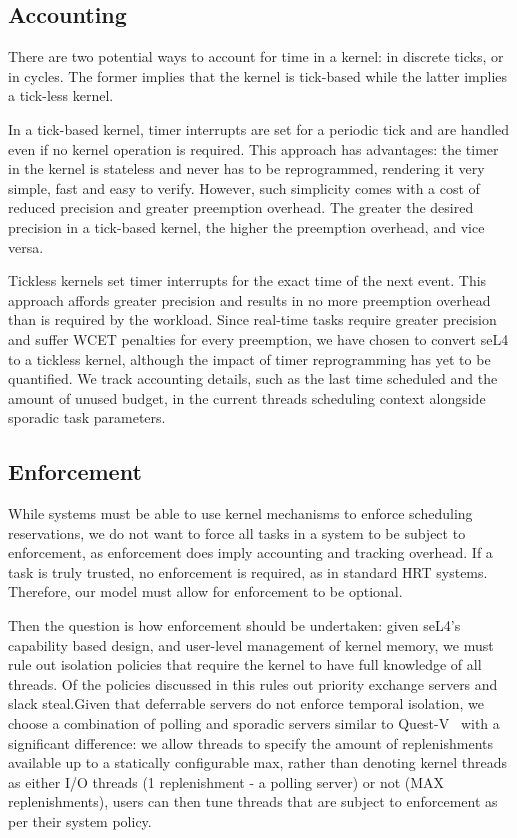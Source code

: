 
\subsection{Accounting}
\label{sec:tick-v-tickless}

There are two potential ways to account for time in a kernel: in discrete ticks, or in cycles.
The former implies that the kernel is tick-based while the latter implies a tick-less kernel.

In a tick-based kernel, timer interrupts are set for a periodic tick and are handled even if no kernel operation is required.
This approach has advantages: the timer in the kernel is stateless and never has to be reprogrammed, rendering it very simple, fast and easy to verify.
However, such simplicity comes with a cost of reduced precision and greater preemption overhead.
The greater the desired precision in a tick-based kernel, the higher the preemption overhead, and vice versa.

Tickless kernels set timer interrupts for the exact time of the next event.
This approach affords greater precision and results in no more preemption overhead than is required by the workload.
Since real-time tasks require greater precision and suffer \gls{WCET} penalties for every preemption, we have chosen to convert seL4 to a tickless kernel, although the impact of timer reprogramming has yet to be quantified.
We track accounting details, such as the last time scheduled and the amount of unused budget, in the current threads scheduling context alongside sporadic task parameters.


\subsection{Enforcement}

While systems must be able to use kernel mechanisms to enforce scheduling reservations, we do not want to force
all tasks in a system to be subject to enforcement, as enforcement does imply accounting and tracking overhead.
If a task is truly trusted, no enforcement is required, as in standard \gls{HRT} systems.
Therefore, our model must allow for enforcement to be optional.

Then the question is how enforcement should be undertaken: given seL4's capability based design, and user-level management of kernel memory, we must rule out isolation policies that require the kernel to have full knowledge of all threads.
Of the policies discussed in  this rules out priority exchange servers and slack steal.Given that deferrable servers do not enforce temporal isolation, we choose a combination of polling and sporadic servers similar to Quest-V~\citep{Danish_LW_2011} with a significant difference: we allow threads to specify the amount of replenishments available up to a statically configurable max, rather than denoting kernel threads as either I/O threads (1 replenishment - a polling server) or not (MAX replenishments), users can then tune threads that are subject to enforcement as per their system policy.

